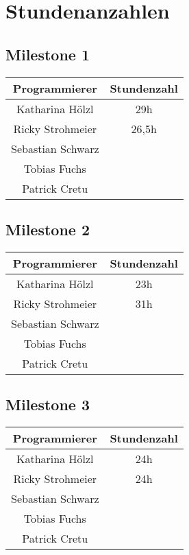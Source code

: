 \chapter{Stundenanzahlen}
\section{Milestone 1}
\begin{center}
	\begin{tabular}{|c|c|}
		\hline \textbf{Programmierer} & \textbf{Stundenzahl} \\ 
		\hline Katharina Hölzl  & 29h \\ 
		\hline Ricky Strohmeier & 26,5h \\ 
		\hline Sebastian Schwarz &  \\ 
		\hline Tobias Fuchs &  \\ 
		\hline Patrick Cretu &  \\ 
		\hline 
	\end{tabular}
\end{center} 
\section{Milestone 2}
\begin{center}
	\begin{tabular}{|c|c|}
		\hline \textbf{Programmierer} & \textbf{Stundenzahl} \\ 
		\hline Katharina Hölzl  & 23h  \\ 
		\hline Ricky Strohmeier & 31h\\ 
		\hline Sebastian Schwarz &  \\ 
		\hline Tobias Fuchs &  \\ 
		\hline Patrick Cretu &  \\ 
		\hline 
	\end{tabular}
\end{center} 
\section{Milestone 3}
\begin{center}
	\begin{tabular}{|c|c|}
		\hline \textbf{Programmierer} & \textbf{Stundenzahl} \\ 
		\hline Katharina Hölzl  & 24h \\ 
		\hline Ricky Strohmeier & 24h\\ 
		\hline Sebastian Schwarz &  \\ 
		\hline Tobias Fuchs &  \\ 
		\hline Patrick Cretu &  \\ 
		\hline 
	\end{tabular}
\end{center} 
